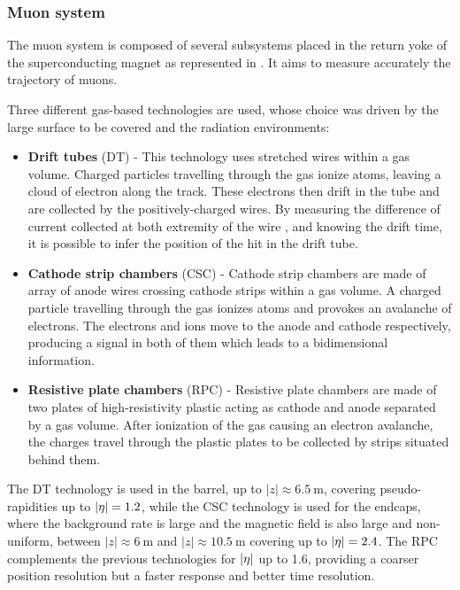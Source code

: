         \subsubsection{Muon system}

    The muon system is composed of several subsystems placed in the return yoke of
    the superconducting magnet as represented in . It aims to
    measure accurately the trajectory of muons.


    Three different gas-based technologies are used, whose choice was driven by the
    large surface to be covered and the radiation environments:
    \begin{itemize}
        \item \textbf{Drift tubes} (DT) - This technology uses stretched wires within
            a gas volume. Charged particles travelling through the gas ionize atoms,
            leaving a cloud of electron along the track. These electrons then drift
            in the tube and are collected by the positively-charged wires. By measuring
            the difference of current collected at both extremity of the wire , and knowing
            the drift time, it is possible to infer the position of the hit in the drift
            tube.
        \item \textbf{Cathode strip chambers} (CSC) - Cathode strip chambers are
            made of array of anode wires crossing cathode strips within a gas volume.
            A charged particle travelling through the gas ionizes atoms and provokes an
            avalanche of electrons. The electrons and ions move to the anode and
            cathode respectively, producing a signal in both of them which leads to
            a bidimensional information.
        \item \textbf{Resistive plate chambers} (RPC) - Resistive plate chambers are
            made of two plates of high-resistivity plastic acting as cathode and anode
            separated by a gas volume. After ionization of the gas causing an
            electron avalanche, the charges travel through the plastic plates to be
            collected by strips situated behind them.
    \end{itemize}

    The DT technology is used in the barrel, up to $\left|z\right| \approx 6.5~\text{m}$, covering
    pseudo-rapidities up to $\left| \eta \right| = 1.2$, while the CSC technology is used for the endcaps,
    where the background rate is large and the magnetic field is also large and non-uniform,
    between $\left|z\right| \approx 6~\text{m}$ and $\left|z\right| \approx 10.5~\text{m}$
    covering up to $\left| \eta \right| = 2.4$. The RPC complements the previous technologies for
    $\left| \eta \right|$ up to 1.6, providing a coarser position resolution but a faster response
    and better time resolution.

